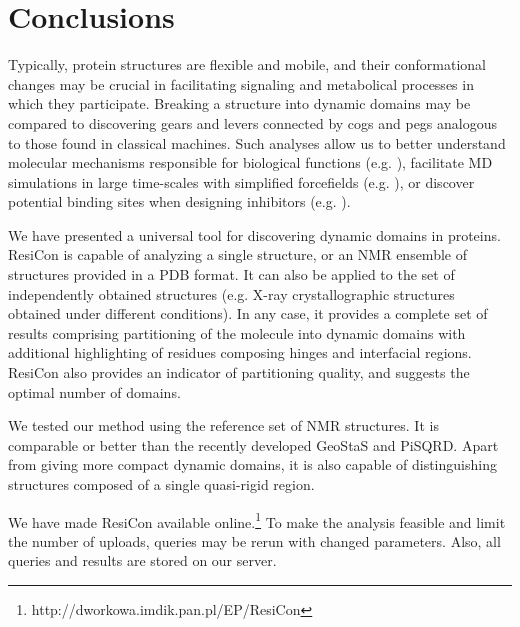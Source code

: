 \section{Conclusions}
Typically, protein structures are flexible and mobile, and their conformational changes may be crucial in facilitating signaling and metabolical processes in which they participate.
Breaking a structure into dynamic domains may be compared to discovering gears and levers connected by cogs and pegs analogous to those found in classical machines.
Such analyses allow us to better understand molecular mechanisms responsible for biological functions (e.g. \cite{taylor2013classification}), facilitate MD simulations in large time-scales with simplified forcefields (e.g. \cite{sinitskiy2012optimal}), or discover potential binding sites when designing inhibitors (e.g. \cite{zhang2009defining}).

We have presented a universal tool for discovering dynamic domains in proteins.
ResiCon is capable of analyzing a single structure, or an NMR ensemble of structures provided in a PDB format.
It can also be applied to the set of independently obtained structures (e.g. X-ray crystallographic structures obtained under different conditions).
In any case, it provides a complete set of results comprising partitioning of the molecule into dynamic domains with additional highlighting of residues composing hinges and interfacial regions.
ResiCon also provides an indicator of partitioning quality, and suggests the optimal number of domains.

We tested our method using the reference set of NMR structures.
It is comparable or better than the recently developed GeoStaS and PiSQRD.
Apart from giving more compact dynamic domains, it is also capable of distinguishing structures composed of a single quasi-rigid region.

We have made ResiCon available online.\footnote{http://dworkowa.imdik.pan.pl/EP/ResiCon}
To make the analysis feasible and limit the number of uploads, queries may be rerun with changed parameters.
Also, all queries and results are stored on our server.


